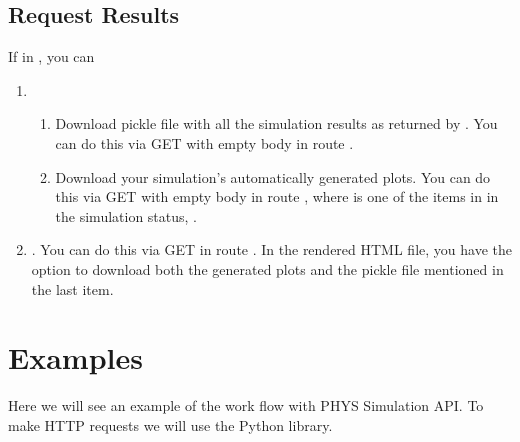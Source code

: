 \documentclass[a4paper,landscape,10pt,english]{sphinxmanual}
\begin{document}
\subsection{Request Results}
\label{\detokenize{start/overview:request-results}}
If  in {\hyperref[\detokenize{start/overview:simstatus}]{}}, you can
\begin{enumerate}
%
\item {} 
\begin{enumerate}
%
\item {} 
Download pickle file with all the simulation results as returned by
. You can do this via GET with empty body
in route .

\item {} 
Download your simulation’s automatically generated plots. You can do this
via GET with empty body in route
, where
 is one of the items in  in the
simulation status, {\hyperref[\detokenize{start/overview:simstatus}]{}}.

\end{enumerate}

\item {} 
. You can do this via GET in route
. In the rendered HTML file, you have the
option to download both the generated plots and the pickle file mentioned in
the last item.

\end{enumerate}


\section{Examples}
\label{\detokenize{start/examples:examples}}\label{\detokenize{start/examples:start-examples}}\label{\detokenize{start/examples::doc}}
Here we will see an example of the work flow with PHYS Simulation API. To make
HTTP requests we will use the  Python library.
\end{document}
